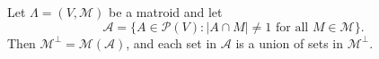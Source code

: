 Let $\Lambda = (V, \mathcal{M})$ be a matroid and let
$$\mathcal{A} = \{A \in \mathcal{P}(V) : |A \cap M| \neq 1 \text{ for all } M \in \mathcal{M}\}.$$
Then $\mathcal{M}^\perp = \mathcal{M}(\mathcal{A})$, and each set in $\mathcal{A}$ is a union of sets in $\mathcal{M}^\perp$.
